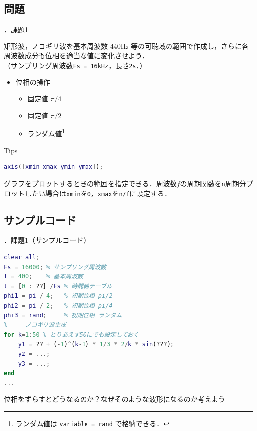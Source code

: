 \documentclass[aspectratio=43]{beamer}
\newcommand{\showsec}{\thesection ．}
\begin{document}
\subsection{問題}
\begin{frame}[t,containsverbatim]{\showsec 課題1}
    \begin{exampleblock}{}
        矩形波，ノコギリ波を基本周波数 440Hz 等の可聴域の範囲で作成し，さらに各周波数成分も位相を適当な値に変化させよう．\\
        （サンプリング周波数\verb|Fs = 16kHz|，長さ\verb|2s|．）
        \begin{itemize}
            \item 位相の操作
                  \begin{itemize}
                      \item 固定値 \(\pi/4\)
                      \item 固定値 \(\pi/2\)
                      \item ランダム値\footnote{ランダム値は \texttt{variable = rand} で格納できる．}
                  \end{itemize}
        \end{itemize}
    \end{exampleblock}
    \begin{block}{Tips}
        \begin{lstlisting}[language={Matlab},numbers={none},frame={none},xleftmargin=0em]
axis([xmin xmax ymin ymax]);
        \end{lstlisting}
        グラフをプロットするときの範囲を指定できる．周波数\(f\)の周期関数を\texttt{n}周期分プロットしたい場合は\texttt{xmin}を\texttt{0}，\texttt{xmax}を\texttt{n/f}に設定する．
    \end{block}
\end{frame}
\subsection{サンプルコード}
\begin{frame}[t,containsverbatim]{\showsec 課題1（サンプルコード）}
    \begin{lstlisting}[language={Matlab}]
clear all;
Fs = 16000; % サンプリング周波数
f = 400;    % 基本周波数
t = [0 : ??] /Fs % 時間軸テーブル
phi1 = pi / 4;   % 初期位相 pi/2
phi2 = pi / 2;   % 初期位相 pi/4
phi3 = rand;     % 初期位相 ランダム
% --- ノコギリ波生成 ---
for k=1:50 % とりあえず50にでも設定しておく
    y1 = ?? + (-1)^(k-1) * 1/3 * 2/k * sin(???);
    y2 = ...;
    y3 = ...;
end
...
\end{lstlisting}
    \begin{block}{}
        位相をずらすとどうなるのか？なぜそのような波形になるのか考えよう
    \end{block}
\end{frame}
\end{document}
